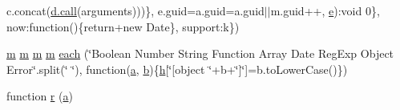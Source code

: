 \begin{DoxyCompactItemize}
c.\+concat(\hyperlink{_chart_8_radar_8js_aafc46d047b4d7639fd2c4b927ec5048c}{d.\+call}(arguments)))\}, e.\+guid=a.\+guid=a.\+guid$\vert$$\vert$m.\+guid++, \hyperlink{jquery-ui_8min_8js_abea95a4e94bc6f4151d5683d4c12c3f4}{e})\+:void 0\}, now\+:function()\{return+new Date\}, support\+:k\})
\item 
\hyperlink{_chart_8min_8js_a9e77e016b2928d7dcb493b89a0c9dc32}{m} \hyperlink{_chart_8min_8js_a9e77e016b2928d7dcb493b89a0c9dc32}{m} \hyperlink{_chart_8min_8js_a9e77e016b2928d7dcb493b89a0c9dc32}{m} \hyperlink{_chart_8min_8js_a9e77e016b2928d7dcb493b89a0c9dc32}{m} \hyperlink{jquery-1_811_81_8min_8js_a18d9b499a0765bf2fe5f372ff2fc0236}{each} (\char`\"{}Boolean Number String Function Array Date Reg\+Exp Object Error\char`\"{}.split(\char`\"{} \char`\"{}), function(\hyperlink{_chart_8min_8js_aef3b685c08bc6c76c8e729bd0e93901d}{a}, \hyperlink{bootstrap_8min_8js_a398bb8542498d1b14178b02b99df309b}{b})\{\hyperlink{jquery-ui_8min_8js_a79fe0eb780a2a4b5543b4dddf8b6188a}{h}\mbox{[}\char`\"{}\mbox{[}object \char`\"{}+b+\char`\"{}\mbox{]}\char`\"{}\mbox{]}=b.\+to\+Lower\+Case()\})
\item 
function \hyperlink{jquery-1_811_81_8min_8js_a96f65b399314d93896076ceb474b6b9b}{r} (\hyperlink{_chart_8min_8js_aef3b685c08bc6c76c8e729bd0e93901d}{a})
\end{DoxyCompactItemize}
